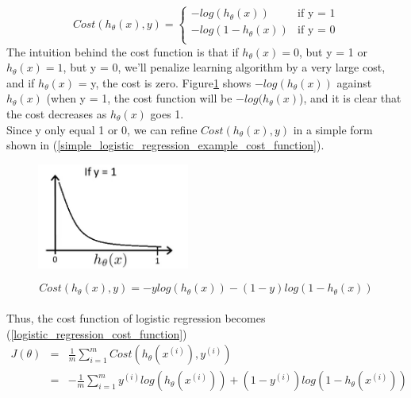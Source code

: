 \documentclass{article}
\begin{document}
\begin{equation}\label{logistic_regression_example_cost_function}
Cost(h_{\theta}(x), y) = \left\{ \begin{array}{ll}
-log(h_{\theta}(x)) & \textrm{if y = 1}\\
-log(1 - h_{\theta}(x)) & \textrm{if y = 0}\\
\end{array} \right.
\end{equation}
The intuition behind the cost function is that if $h_{\theta}(x) = 0$, but y = 1 or $h_{\theta}(x) = 1$, but y = 0, we'll penalize learning algorithm by a very large cost, and if $h_{\theta}(x)$ = y, the cost is zero. Figure\ref{cost_fuction_log_plot} shows $-log(h_{\theta}(x))$ against $h_{\theta}(x)$ (when y = 1, the cost function will be $-log(h_{\theta}(x)$), and it is clear that the cost decreases as $h_{\theta}(x)$ goes 1.
\\
Since y only equal 1 or 0, we can refine $Cost(h_{\theta}(x), y)$ in a simple form shown in (\ref{simple_logistic_regression_example_cost_function}).

\begin{figure}[ht]
  \centering
  \includegraphics[width=5cm]{Figure4.jpg}\\
  \caption{}\label{cost_fuction_log_plot}
\end{figure}

\begin{equation}\label{simple_logistic_regression_example_cost_function}
Cost(h_{\theta}(x), y) = -ylog(h_{\theta}(x)) - (1 - y)log(1 - h_{\theta}(x))
\end{equation}
\\
Thus, the cost function of logistic regression becomes (\ref{logistic_regression_cost_function})
\begin{eqnarray}\label{logistic_regression_cost_function}
  J(\theta) &   =   &\frac{1}{m} \sum_{i=1}^{m} Cost(h_{\theta}(x^{(i)}), y^{(i)})\\
            &   =   &-\frac{1}{m} \sum_{i=1}^{m} y^{(i)}log(h_{\theta}(x^{(i)})) + (1 - y^{(i)})log(1 - h_{\theta}(x^{(i)})) 
\end{eqnarray}
\end{document}

